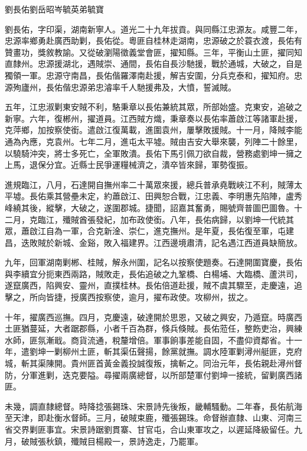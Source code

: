 
\begin{pinyinscope}
劉長佑劉岳昭岑毓英弟毓寶

劉長佑，字印渠，湖南新寧人。道光二十九年拔貢。與同縣江忠源友。咸豐二年，忠源率鄉勇赴廣西助剿，長佑從。粵匪自桂林走湖南，忠源破之於蓑衣渡，長佑有贊畫功，獎敘教諭。又從破瀏陽徵義堂會匪，擢知縣。三年，平衡山土匪，擢同知直隸州。忠源援湖北，遇賊崇、通間，長佑自長沙馳援，戰於通城，大破之，自是獨領一軍。忠源守南昌，長佑偕羅澤南赴援，解吉安圍，分兵克泰和，擢知府。忠源殉廬州，長佑偕忠源弟忠濬率千人馳援弗及，大憤，誓滅賊。

五年，江忠淑剿東安賊不利，駱秉章以長佑兼統其眾，所部始盛。克東安，追破之新寧。六年，復郴州，擢道員。江西賊方熾，秉章奏以長佑率蕭啟江等諸軍赴援，克萍鄉，加按察使銜。遣啟江復萬載，進圍袁州，屢擊敗援賊。十一月，降賊李能通為內應，克袁州。七年二月，進屯太平墟。賊由吉安大舉來襲，列陣二十餘里，以驍騎沖突，將士多死亡，全軍敗潰。長佑下馬引佩刀欲自裁，營務處劉坤一擁之上馬，退保分宜。近縣士民爭運糧械濟之，潰卒皆來歸，軍勢復振。

進規臨江，八月，石達開自撫州率二十萬眾來援，總兵普承堯戰峽江不利，賊薄太平墟。長佑乘其營壘未定，約蕭啟江、田興恕合戰，江忠義、李明惠先陷陣，盧秀峰繞其後，縱擊，大破之，遂圍郡城。捷聞，詔嘉其奮勇，賜號齊普圖巴圖魯。十二月，克臨江，殲賊酋張發紀，加布政使銜。八年，長佑病歸，以劉坤一代統其眾，蕭啟江自為一軍，合克新淦、崇仁，進克撫州。是年夏，長佑復至軍，屯建昌，迭敗賊於新城、金谿，敗入福建界。江西邊境肅清，記名遇江西道員缺簡放。

九年，回軍湖南剿郴、桂賊，解永州圍，記名以按察使題奏。石達開圍寶慶，長佑與李續宜分扼東西兩路，賊敗走，長佑追破之九鞏橋、白楊埔、大臨橋、蘆洪司，遂竄廣西，陷興安、靈州，直撲桂林。長佑倍道赴援，賊不虞其驟至，走慶遠，追擊之，所向皆捷，授廣西按察使，逾月，擢布政使。攻柳州，拔之。

十年，擢廣西巡撫。四月，克慶遠，破達開於思恩，又破之興安，乃遁竄。時廣西土匪猶蔓延，大者踞郡縣，小者千百為群，倏兵倏賊。長佑蒞任，整飭吏治，興練水師，匪氛漸戢。商貨流通，稅釐增倍。軍事餉事差能自固，不盡仰資鄰省。十一年，遣劉坤一剿柳州土匪，斬其渠伍聲揚，餘黨就撫。調水陸軍剿潯州艇匪，克府城，斬其渠陳開。貴州匪首黃金義投誠復叛，擒斬之。同治元年，長佑親赴潯州督防，分軍進剿，迭克要隘。尋擢兩廣總督，以所部楚軍付劉坤一接統，留剿廣西諸匪。

未幾，調直隸總督。時降捻張錫珠、宋景詩先後叛，畿輔騷動。二年春，長佑航海至天津，即赴衡水督師。三月，破賊束鹿，殲張錫珠。命督辦直隸、山東、河南三省交界剿匪事宜。宋景詩踞劉貫寨、甘官屯，合山東軍攻之，以遲延降級留任。九月，破賊張秋鎮，殲賊目楊殿一，景詩逸走，乃罷軍。


\end{pinyinscope}
